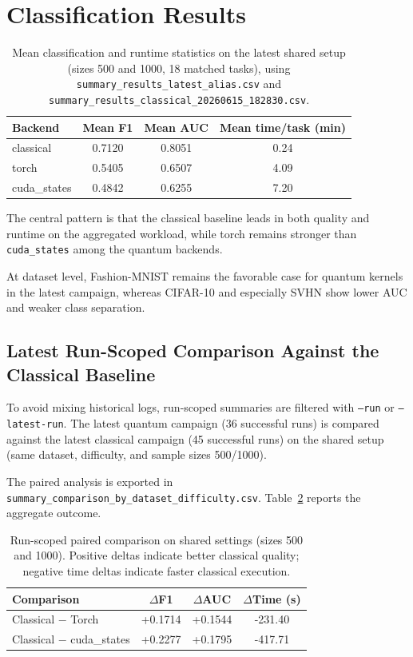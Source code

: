 \documentclass[10pt,twocolumn,letterpaper]{article}
\begin{document}
\section{Classification Results}
\begin{table}[t]
\centering
\caption{Mean classification and runtime statistics on the latest shared setup (sizes 500 and 1000, 18 matched tasks), using \texttt{summary\_results\_latest\_alias.csv} and \texttt{summary\_results\_classical\_20260615\_182830.csv}.}
\label{tab:classification-summary}
\small
\begin{tabular}{lccc}
\toprule
\textbf{Backend} & \textbf{Mean F1} & \textbf{Mean AUC} & \textbf{Mean time/task (min)} \\
\midrule
classical & 0.7120 & 0.8051 & 0.24 \\
torch & 0.5405 & 0.6507 & 4.09 \\
cuda\_states & 0.4842 & 0.6255 & 7.20 \\
\bottomrule
\end{tabular}
\end{table}

The central pattern is that the classical baseline leads in both quality and runtime on the aggregated workload, while torch remains stronger than \texttt{cuda\_states} among the quantum backends.

At dataset level, Fashion-MNIST remains the favorable case for quantum kernels in the latest campaign, whereas CIFAR-10 and especially SVHN show lower AUC and weaker class separation.

\subsection{Latest Run-Scoped Comparison Against the Classical Baseline}
To avoid mixing historical logs, run-scoped summaries are filtered with \texttt{--run} or \texttt{--latest-run}. The latest quantum campaign (36 successful runs) is compared against the latest classical campaign (45 successful runs) on the shared setup (same dataset, difficulty, and sample sizes 500/1000).

The paired analysis is exported in \texttt{summary\_comparison\_by\_dataset\_difficulty.csv}. Table~\ref{tab:latest-run-comparison} reports the aggregate outcome.

\begin{table}[t]
\centering
\caption{Run-scoped paired comparison on shared settings (sizes 500 and 1000). Positive deltas indicate better classical quality; negative time deltas indicate faster classical execution.}
\label{tab:latest-run-comparison}
\small
\begin{tabular}{lccc}
\toprule
\textbf{Comparison} & $\Delta$\textbf{F1} & $\Delta$\textbf{AUC} & $\Delta$\textbf{Time (s)} \\
\midrule
Classical $-$ Torch & +0.1714 & +0.1544 & -231.40 \\
Classical $-$ cuda\_states & +0.2277 & +0.1795 & -417.71 \\
\bottomrule
\end{tabular}
\end{table}
\end{document}

